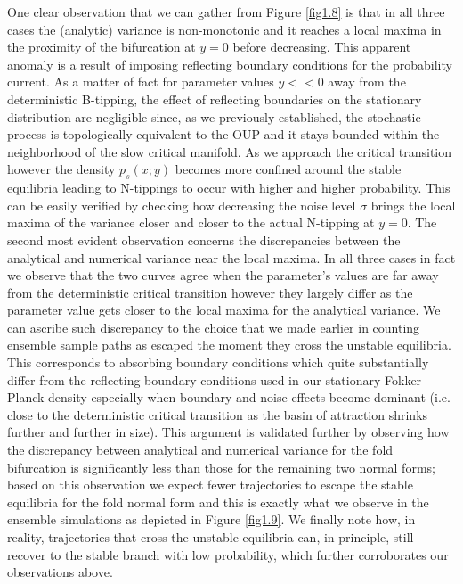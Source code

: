 \documentclass[../main.tex]{subfiles}
\begin{document}
One clear observation that we can gather from Figure \ref{fig1.8} is that in all three cases the (analytic) variance is non-monotonic and it reaches a local maxima in the proximity of the bifurcation at $y=0$ before decreasing. This apparent anomaly is a result of imposing reflecting boundary conditions for the probability current.
As a matter of fact for parameter values $y<<0$ away from the deterministic B-tipping, the effect of reflecting boundaries on the stationary distribution are negligible since, as we previously established, the stochastic process is topologically equivalent to the OUP and it stays bounded within the neighborhood of the slow critical manifold. 
As we approach the critical transition however the density $p_{s}(x; y)$ becomes more confined around the stable equilibria leading to N-tippings to occur with higher and higher probability. This can be easily verified by checking how decreasing the noise level $\sigma$ brings the local maxima of the variance closer and closer to the actual N-tipping at $y=0$.
The second most evident observation concerns the discrepancies between the analytical and numerical variance near the local maxima. In all three cases in fact we observe that the two curves agree when the parameter's values are far away from the deterministic critical transition however they largely differ as the parameter value gets closer to the local maxima for the analytical variance.
We can ascribe such discrepancy to the choice that we made earlier in counting ensemble sample paths as escaped the moment they cross the unstable equilibria. This corresponds to absorbing boundary conditions which quite substantially differ from the reflecting boundary conditions used in our stationary Fokker-Planck density especially when boundary and noise effects become dominant (i.e. close to the deterministic critical transition as the basin of attraction shrinks further and further in size).
This argument is validated further by observing how the discrepancy between analytical and numerical variance for the fold bifurcation is significantly less than those for the remaining two normal forms; based on this observation we expect fewer trajectories to escape the stable equilibria for the fold normal form and this is exactly what we observe in the ensemble simulations as depicted in Figure \ref{fig1.9}.
We finally note how, in reality, trajectories that cross the unstable equilibria can, in principle, still recover to the stable branch with low probability, which further corroborates our observations above.
\end{document}
